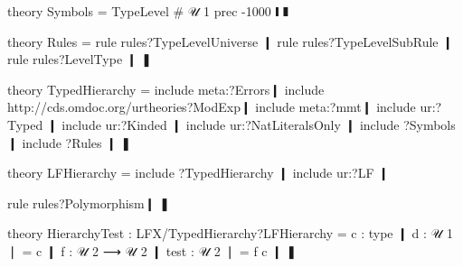\begin{mmtcode}[caption={Symbols and Rules\protect\footnotemark},label=lst:lf:lfx:hierarchy:implmmt]
theory Symbols =
   TypeLevel # 𝒰 1 prec -1000 ❙
❚

theory Rules =
  rule rules?TypeLevelUniverse ❙
  rule rules?TypeLevelSubRule ❙
  rule rules?LevelType ❙
❚

theory TypedHierarchy =
   include meta:?Errors❙
   include http://cds.omdoc.org/urtheories?ModExp❙
   include meta:?mmt❙
   include ur:?Typed ❙
   include ur:?Kinded ❙
   include ur:?NatLiteralsOnly ❙
   include ?Symbols ❙
   include ?Rules ❙
❚

theory LFHierarchy =
   include ?TypedHierarchy ❙
   include ur:?LF ❙
   
   rule rules?Polymorphism❙
❚
\end{mmtcode}

\begin{mmtcode}[caption={A Simple Theory for Universes\protect\footnotemark},label=lst:lf:lfx:hierarchy:testmmt]
theory HierarchyTest : LFX/TypedHierarchy?LFHierarchy =
	c : type ❙
	d : 𝒰 1 ❘ = c ❙
	f : 𝒰 2 ⟶ 𝒰 2 ❙
	test : 𝒰 2 ❘ = f c ❙
❚
\end{mmtcode}
